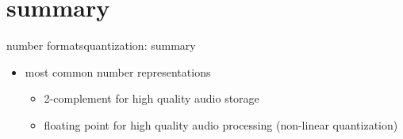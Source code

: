	\section{summary}	
		\begin{frame}{number formats}{quantization: summary }
            \begin{itemize}
                \item   most common number representations
                    \begin{itemize}
                        \item   2-complement for high quality audio storage
                        \item   floating point for high quality audio processing (non-linear quantization)
                    \end{itemize}
            \end{itemize}
		\end{frame}
 



